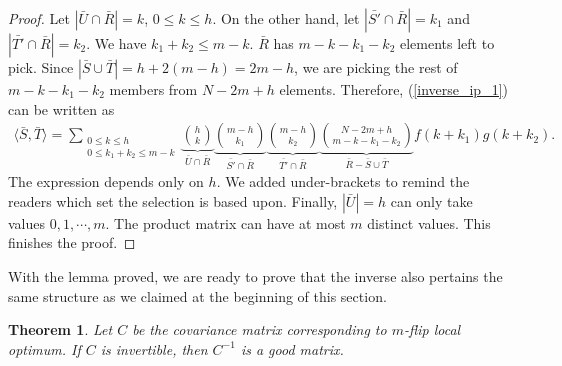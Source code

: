 \documentclass[10pt]{article}
\newtheorem{theorem}{\bf Theorem}
\newenvironment{Proof of lemma}{\noindent{\bf Proof of Lemma}}{\hfill$\Box$\newline}
\newenvironment{Proof of claim}{\noindent{\bf Proof of claim}}{\hfill$\Box$\newline}
\newenvironment{Proof of theorem}{\noindent{\bf Proof of Theorem}}{\hfill\scriptsize{$\Box$}\newline}
\newenvironment{Proof of theorems}{\noindent{\bf Proof of Theorems}}{\hfill$\Box$\newline}
\newenvironment{Proof of proposition}{\noindent{\bf Proof of Proposition}}{\hfill$\Box$\newline}
\newenvironment{Proof of propositions}{\noindent{\bf Proof of Propositions}}{\hfill$\Box$\newline}
\newenvironment{Proof of exercise}{\noindent{\it Proof of Exercise:}}{\hfill$\Box$}
\numberwithin{equation}{section}
\begin{document}
\begin{proof}
    Let $|\bar{U} \cap \bar{R}| = k$, $0 \leq k \leq h$.  On the other hand, let $|\bar{S'} \cap \bar{R}| = k_1$ and $|\bar{T'} \cap \bar{R}| = k_2$. We have $k_1+k_2 \leq m-k$. $\bar{R}$ has $m-k-k_1-k_2$ elements left to pick. Since $|\bar{S} \cup \bar{T}| = h+2(m-h) = 2m - h$, we are picking the rest of $m-k-k_1-k_2$ members from $N -2m +h$ elements. Therefore, (\ref{inverse_ip_1}) can be written as
    \begin{align} \label{inverse_ip}
        \langle \bar{S}, \bar{T} \rangle = \sum_{\substack{0 \leq k \leq h \\ 0 \leq k_1+k_2 \leq m-k}} \underbrace{\binom{h}{k}}_{\bar{U} \cap \bar{R}} \underbrace{\binom{m-h}{k_1}}_{\bar{S'} \cap \bar{R}}\underbrace{\binom{m-h}{k_2}}_{\bar{T'} \cap \bar{R}}\underbrace{\binom{N-2m+h}{m-k-k_1-k_2}}_{\bar{R} - \bar{S}\cup \bar{T}}f(k+k_1)g(k+k_2).
    \end{align}
    The expression depends only on $h$. We added under-brackets to remind the readers which set the selection is based upon. Finally, $|\bar{U}| = h$ can only take values $0,1,\cdots, m$. The product matrix can have at most $m$ distinct values. This finishes the proof.
\end{proof}
With the lemma proved, we are ready to prove that the inverse also pertains the same structure as we claimed at the beginning of this section.
\begin{theorem}
    Let $C$ be the covariance matrix corresponding to $m$-flip local optimum. If $C$ is invertible, then $C^{-1}$ is a good matrix.
\end{theorem}
\end{document}
